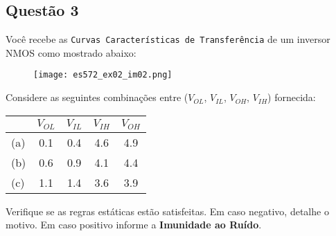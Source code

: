 \documentclass{article}
\begin{document}
        \subsection{Questão 3}
            \begin{exercise}
                Você recebe as \texttt{Curvas Características de Transferência} de um inversor NMOS como mostrado abaixo:
                    \begin{figure}[H]
                        \centering
                        \texttt{[image: es572\_ex02\_im02.png]}
                    \end{figure} \noindent
                Considere as seguintes combinações entre ($V_{OL}$, $V_{IL}$, $V_{OH}$, $V_{IH}$) fornecida:
                    \begin{table}[H]
                        \centering  
                        \begin{tabular}[]{l cccc}\hline
                                & $V_{OL}$ & $V_{IL}$ & $V_{IH}$ & $V_{OH}$\\\hline
                            (a) & 0.1      & 0.4      & 4.6      & 4.9\\
                            (b) & 0.6      & 0.9      & 4.1      & 4.4\\
                            (c) & 1.1      & 1.4      & 3.6      & 3.9\\\hline
                        \end{tabular}
                    \end{table}
                Verifique se as regras estáticas estão satisfeitas. Em caso negativo, detalhe o motivo. Em caso positivo informe a \textbf{Imunidade ao Ruído}.
            \end{exercise}
\end{document}
